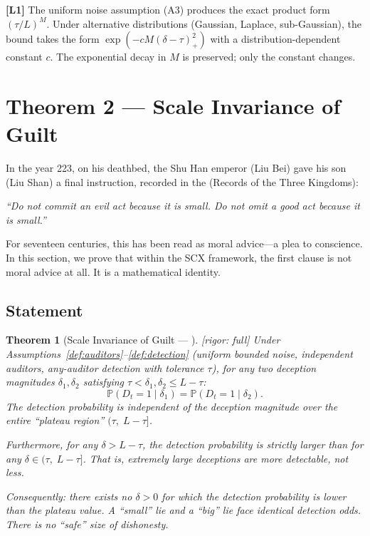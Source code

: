 \documentclass[11pt,a4paper]{article}
\newtheorem{theorem}{Theorem}[section]
\theoremstyle{definition}
\theoremstyle{remark}
\newcommand{\rigorFull}{\textcolor{green!60!black}{[rigor: full]}}
\newcommand{\limitationTag}[1]{\textsf{\textbf{[L#1]}}}
\newcommand{\SCX}{\textsc{SCX}}
\newcommand{\Pbb}{\mathbb{P}}
\newcommand{\deception}{\delta}
\newcommand{\threshold}{\tau}
\newcommand{\tol}{L}
\begin{document}
\limitationTag{1} The uniform noise assumption (A3) produces the exact product form $(\threshold/\tol)^M$. Under alternative distributions (Gaussian, Laplace, sub-Gaussian), the bound takes the form $\exp(-c M (\deception - \threshold)_+^2)$ with a distribution-dependent constant $c$. The exponential decay in $M$ is preserved; only the constant changes.

\section{Theorem 2 --- Scale Invariance of Guilt }
\label{sec:thm2}

In the year 223, on his deathbed, the Shu Han emperor  (Liu Bei) gave his son  (Liu Shan) a final instruction, recorded in the \textit{} (Records of the Three Kingdoms):

\begin{center}
\Large 
\end{center}
\smallskip
\begin{center}
{\it ``Do not commit an evil act because it is small. Do not omit a good act because it is small.''}
\end{center}

\medskip
For seventeen centuries, this has been read as moral advice---a plea to conscience. In this section, we prove that within the \SCX{} framework, the first clause is not moral advice at all. It is a mathematical identity.

\subsection{Statement}

\begin{theorem}[Scale Invariance of Guilt --- ]
\label{thm:scale_invariance}
\rigorFull
Under Assumptions~\ref{def:auditors}--\ref{def:detection} (uniform bounded noise, independent auditors, any-auditor detection with tolerance $\threshold$), for any two deception magnitudes $\deception_1, \deception_2$ satisfying $\threshold < \deception_1, \deception_2 \leq \tol - \threshold$:
\begin{equation}
    \Pbb(D_t = 1 \mid \deception_1) = \Pbb(D_t = 1 \mid \deception_2).
    \label{eq:scale_invariance}
\end{equation}
The detection probability is independent of the deception magnitude over the entire ``plateau region'' $(\threshold,\; \tol - \threshold]$.

Furthermore, for any $\deception > \tol - \threshold$, the detection probability is \emph{strictly larger} than for any $\deception \in (\threshold,\; \tol - \threshold]$. That is, extremely large deceptions are \emph{more} detectable, not less.

Consequently: there exists no $\deception > 0$ for which the detection probability is lower than the plateau value. A ``small'' lie and a ``big'' lie face identical detection odds. There is no ``safe'' size of dishonesty.
\end{theorem}
\end{document}
